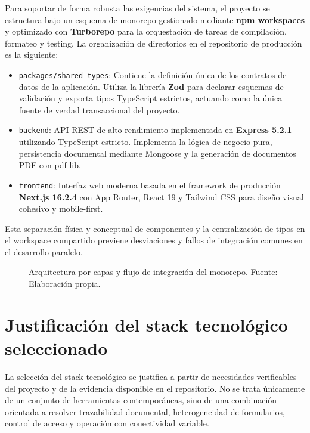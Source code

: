 Para soportar de forma robusta las exigencias del sistema, el proyecto se estructura bajo un esquema de monorepo gestionado mediante \textbf{npm workspaces} y optimizado con \textbf{Turborepo} para la orquestación de tareas de compilación, formateo y testing. La organización de directorios en el repositorio de producción es la siguiente:
\begin{itemize}
    \item \texttt{packages/shared-types}: Contiene la definición única de los contratos de datos de la aplicación. Utiliza la librería \textbf{Zod} para declarar esquemas de validación y exporta tipos TypeScript estrictos, actuando como la única fuente de verdad transaccional del proyecto.
    \item \texttt{backend}: API REST de alto rendimiento implementada en \textbf{Express 5.2.1} utilizando TypeScript estricto. Implementa la lógica de negocio pura, persistencia documental mediante Mongoose y la generación de documentos PDF con pdf-lib.
    \item \texttt{frontend}: Interfaz web moderna basada en el framework de producción \textbf{Next.js 16.2.4} con App Router, React 19 y Tailwind CSS para diseño visual cohesivo y mobile-first.
\end{itemize}

Esta separación física y conceptual de componentes y la centralización de tipos en el workspace compartido previene desviaciones y fallos de integración comunes en el desarrollo paralelo.

\begin{figure}[!htbp]
\centering
\resizebox{0.95\textwidth}{!}{%
%
}
\caption{Arquitectura por capas y flujo de integración del monorepo. Fuente: Elaboración propia.}
\label{fig:arquitectura-software}
\end{figure}

\section{Justificación del stack tecnológico seleccionado}
\label{sec:stack-justificado}

La selección del stack tecnológico se justifica a partir de necesidades verificables del proyecto y de la evidencia disponible en el repositorio. No se trata únicamente de un conjunto de herramientas contemporáneas, sino de una combinación orientada a resolver trazabilidad documental, heterogeneidad de formularios, control de acceso y operación con conectividad variable.

